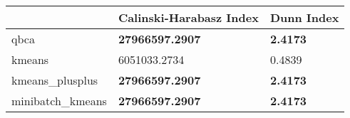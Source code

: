 \begin{table}[htbp]
\centering
\begin{tabular}{lll}
\toprule
 & Calinski-Harabasz Index & Dunn Index \\
\midrule
qbca & \textbf{27966597.2907} & \textbf{2.4173} \\
kmeans & 6051033.2734 & 0.4839 \\
kmeans_plusplus & \textbf{27966597.2907} & \textbf{2.4173} \\
minibatch_kmeans & \textbf{27966597.2907} & \textbf{2.4173} \\
\bottomrule
\end{tabular}
\end{table}

